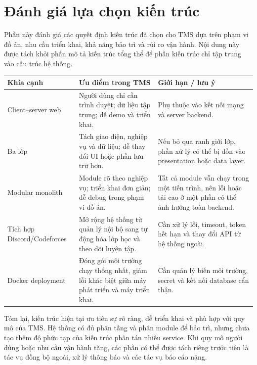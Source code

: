 \documentclass[12pt,a4paper]{article}
\begin{document}
\section{Đánh giá lựa chọn kiến trúc}

Phần này đánh giá các quyết định kiến trúc đã chọn cho TMS dựa trên phạm vi đồ
án, nhu cầu triển khai, khả năng bảo trì và rủi ro vận hành. Nội dung này được
tách khỏi phần mô tả kiến trúc tổng thể để phần kiến trúc chỉ tập trung vào cấu
trúc hệ thống.

\begin{longtable}{L{3cm} L{5.8cm} L{5.8cm}}
\toprule
\textbf{Khía cạnh} & \textbf{Ưu điểm trong TMS} & \textbf{Giới hạn / lưu ý} \\
\midrule
\endhead
Client--server web & Người dùng chỉ cần trình duyệt; dữ liệu tập trung; dễ demo và triển khai. & Phụ thuộc vào kết nối mạng và server backend. \\
Ba lớp & Tách giao diện, nghiệp vụ và dữ liệu; dễ thay đổi UI hoặc phần lưu trữ hơn. & Nếu bỏ qua ranh giới lớp, phần xử lý có thể bị dồn vào presentation hoặc data layer. \\
Modular monolith & Module rõ theo nghiệp vụ; triển khai đơn giản; dễ debug trong phạm vi đồ án. & Tất cả module vẫn chạy trong một tiến trình, nên lỗi hoặc tải cao ở một phần có thể ảnh hưởng toàn backend. \\
Tích hợp Discord/Codeforces & Mở rộng hệ thống từ quản lý nội bộ sang tự động hóa lớp học và theo dõi luyện tập. & Cần xử lý lỗi, timeout, token hết hạn và thay đổi API từ hệ thống ngoài. \\
Docker deployment & Đóng gói môi trường chạy thống nhất, giảm lỗi khác biệt giữa máy phát triển và máy triển khai. & Cần quản lý biến môi trường, secret và kết nối database cẩn thận. \\
\bottomrule
\end{longtable}

Tóm lại, kiến trúc hiện tại ưu tiên sự rõ ràng, dễ triển khai và phù hợp với
quy mô của TMS. Hệ thống có đủ phân tầng và phân module để bảo trì, nhưng chưa
tạo thêm độ phức tạp của kiến trúc phân tán nhiều service. Khi quy mô người
dùng hoặc nhu cầu vận hành tăng, các phần có thể được tách riêng trước tiên là
tác vụ đồng bộ ngoài, xử lý thông báo và các tác vụ báo cáo nặng.
\end{document}
